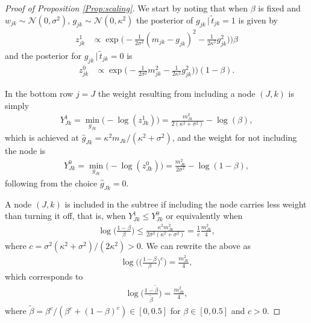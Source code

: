 \documentclass[10pt,a4paper]{amsart}
\newcommand{\Nn}{{\mathcal N}}
\newcommand{\g}{{\, |\,}}
\begin{document}
\begin{proof}[Proof of Proposition \ref{Prop:scaling}]
We start by noting that when $\beta$ is fixed and $w_{jk}\sim\Nn(0,\sigma^2)$, $g_{jk}\sim\Nn(0,\kappa^2)$ the posterior of $g_{jk}\g \tilde{t}_{jk}=1$ is given by
\begin{align*}
z_{jk}^1 & \propto \exp\Big(-\frac{1}{2\sigma^2}(m_{jk}-g_{jk})^2
-\frac{1}{2\kappa^2}g_{jk}^2)\Big)\beta
\end{align*}
and the posterior for $g_{jk}\g \tilde{t}_{jk}=0$ is 
\begin{align*}
z_{jk}^0 & \propto \exp\Big(-\frac{1}{2\sigma^2}m_{jk}^2-\frac{1}{2\kappa^2}g_{jk}^2)\Big)(1-\beta).
\end{align*}

In the bottom row $j=J$ the weight resulting from including a node $(J,k)$ is simply
\begin{align*}
    Y_{Jk}^1=\min_{g_{Jk}}\Big(-\log(z_{Jk}^1)\Big)
=\frac{m_{Jk}^2}{2(\kappa^2+\sigma^2)}-\log(\beta),
\end{align*}
which is achieved at $\hat{g}_{Jk}=\kappa^2m_{Jk}/(\kappa^2+\sigma^2)$, and the weight for not including the node is 
\begin{align*}
    Y_{Jk}^0=\min_{g_{Jk}}\Big(-\log(z_{Jk}^0)\Big)
=\frac{m_{Jk}^2}{2\sigma^2}-\log(1-\beta),
\end{align*}
following from the choice $\hat{g}_{Jk}=0$.

A node $(J,k)$ is included in the subtree if including the node carries less weight than turning it off, that is, when $Y_{Jk}^1\leq Y_{Jk}^0$ or equivalently when 
\begin{align*}
    \log\Big(\frac{1-\beta}{\beta}\Big)
    \leq \frac{\kappa^2m_{Jk}^2}{2\sigma^2(\kappa^2+\sigma^2)}
    =\frac{1}{c}\frac{m_{Jk}^2}{4},
\end{align*}
where $c=\sigma^2(\kappa^2+\sigma^2)/(2\kappa^2)>0$.  We can rewrite the above as 
\begin{align*}
    \log\Bigg(\Big(\frac{1-\beta}{\beta}\Big)^c\Bigg)
    =\frac{m_{Jk}^2}{4},
\end{align*}
which corresponds to 
\begin{align*}
    \log\Big(\frac{1-\widetilde{\beta}}{\widetilde{\beta}}\Big)
    =\frac{m_{Jk}^2}{4},
\end{align*}
where $\widetilde{\beta}=\beta^c/(\beta^c+(1-\beta)^c)\in[0,0.5]$ for $\beta\in[0,0.5]$ and $c>0$. 
\end{proof}
\end{document}
